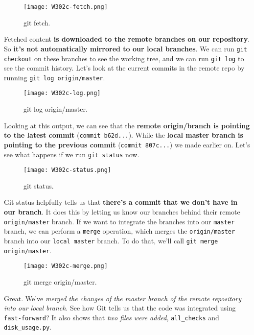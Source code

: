 	\begin{figure} 
		\caption{git fetch.}
		\centering
		\texttt{[image: W302c-fetch.png]}
		\label{W302c-fetch}
	\end{figure}
	
	Fetched content\textbf{ is downloaded to the remote branches on our repository}. So \textbf{it's not automatically mirrored to our local branches}. We can run \verb|git checkout| on these branches to see the working tree, and we can run \verb|git log| to see the commit history. Let's look at the current commits in the remote repo by running \verb|git log origin/master|.
	
	\begin{figure} 
		\caption{git log origin/master.}
		\centering
		\texttt{[image: W302c-log.png]}
		\label{W302c-log}
	\end{figure}
	
	Looking at this output, we can see that the \textbf{remote origin/branch is pointing to the latest commit} (\verb|commit b62d...|). While the \textbf{local master branch is pointing to the previous commit} (\verb|commit 807c...|) we made earlier on. Let's see what happens if we run \verb|git status| now. 
	
	\begin{figure} 
		\caption{git status.}
		\centering
		\texttt{[image: W302c-status.png]}
		\label{W302c-status}
	\end{figure}
	
	Git status helpfully tells us that \textbf{there's a commit that we don't have in our branch}. It does this by letting us know our branches behind their remote \texttt{origin/master} branch. 
	If we want to integrate the branches into our \texttt{master} branch, we can perform a \verb|merge| operation, which merges the \verb|origin/master| branch into our \verb|local master| branch. To do that, we'll call \verb|git merge origin/master|.
	
	\begin{figure} 
		\caption{git merge origin/master.}
		\centering
		\texttt{[image: W302c-merge.png]}
		\label{W302c-merge}
	\end{figure}
	
	Great. We've \textit{merged the changes of the master branch of the remote repository into our local branch}. See how Git tells us that the code was integrated using \verb|fast-forward|? It also shows that \textit{two files were added}, 
	\verb|all_checks| and \verb|disk_usage.py|. 
	
